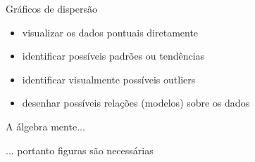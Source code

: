 \documentclass{beamer}
\begin{document}

\begin{frame}{Gráficos de dispersão}
  \begin{itemize}
    \footnotesize
  \item visualizar os dados pontuais diretamente
    \bigskip
  \item identificar possíveis padrões ou tendências
    \bigskip
  \item identificar visualmente possíveis outliers
    \bigskip
  \item desenhar possíveis relações (modelos) sobre os dados
  \end{itemize}
\end{frame}

\begin{frame}
  \begin{block}{}
    \begin{center}
      A álgebra mente...

      \bigskip
      ... portanto figuras são necessárias
    \end{center}
  \end{block}
\end{frame}
\end{document}
